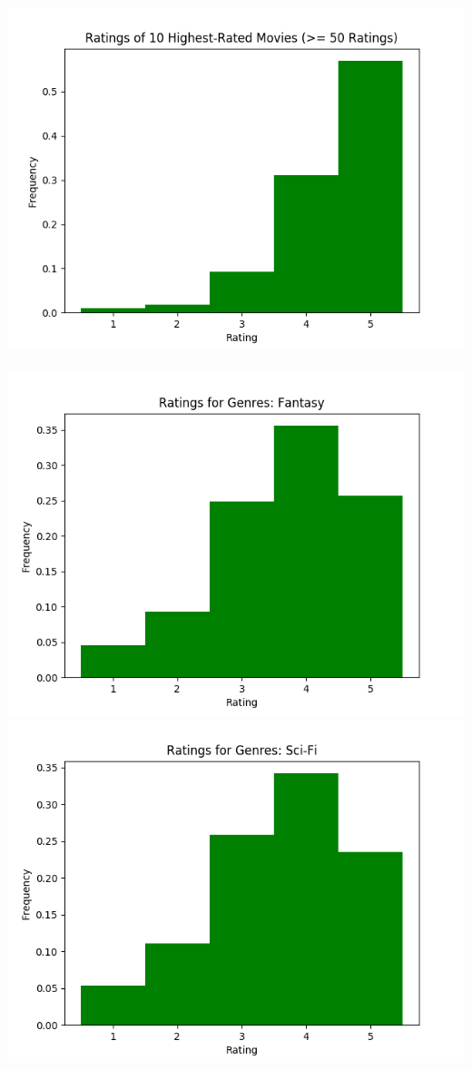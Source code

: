 \includegraphics[scale=0.5]{"Ratings of 10 Highest-Rated Movies (>= 50 Ratings)"} \\ \\
\includegraphics[scale=0.5]{"Ratings for Genres: Fantasy"}
\includegraphics[scale=0.5]{"Ratings for Genres: Sci-Fi"} \\ \\
